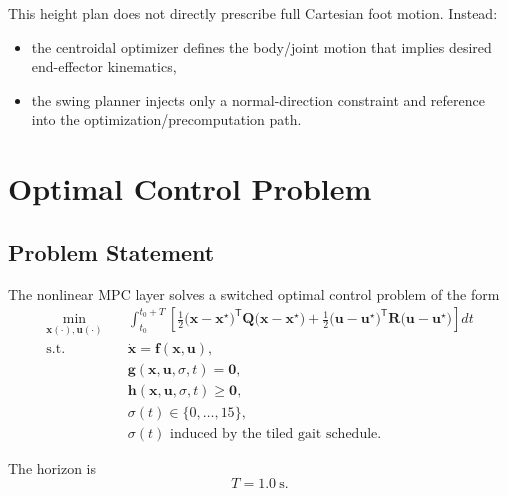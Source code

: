 \documentclass[11pt,a4paper]{article}
\newcommand{\vect}[1]{\bm{#1}}
\newcommand{\mat}[1]{\bm{#1}}
\newcommand{\trans}{^{\mathsf T}}
\begin{document}
This height plan does not directly prescribe full Cartesian foot motion. Instead:
\begin{itemize}[leftmargin=*]
\item the centroidal optimizer defines the body/joint motion that implies desired end-effector kinematics,
\item the swing planner injects only a normal-direction constraint and reference into the optimization/precomputation path.
\end{itemize}

\section{Optimal Control Problem}
\subsection{Problem Statement}
The nonlinear MPC layer solves a switched optimal control problem of the form
\begin{align}
\min_{\vect{x}(\cdot), \vect{u}(\cdot)} \quad &
\int_{t_0}^{t_0+T}
\left[
\frac{1}{2}\big(\vect{x}-\vect{x}^{\star}\big)\trans \mat{Q} \big(\vect{x}-\vect{x}^{\star}\big) +
\frac{1}{2}\big(\vect{u}-\vect{u}^{\star}\big)\trans \mat{R} \big(\vect{u}-\vect{u}^{\star}\big)
\right] dt \\
\text{s.t.}\quad &
\dot{\vect{x}} = \vect{f}(\vect{x},\vect{u}), \\
& \vect{g}(\vect{x},\vect{u},\sigma,t) = \vect{0}, \\
& \vect{h}(\vect{x},\vect{u},\sigma,t) \ge \vect{0}, \\
& \sigma(t) \in \{0,\dots,15\}, \\
& \sigma(t) \text{ induced by the tiled gait schedule.}
\end{align}

The horizon is
\begin{equation}
T = 1.0~\mathrm{s}.
\end{equation}
\end{document}
